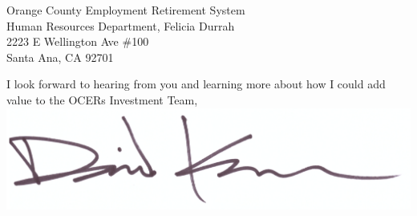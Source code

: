 \documentclass[10pt]{letter}
\begin{document}
\begin{letter}{
  Orange County Employment Retirement System \\ 
  Human Resources Department, Felicia Durrah \\
  2223 E Wellington Ave \#100 \\
  Santa Ana, CA  92701 \\
}
\closing{
  I look forward to hearing from you and learning more about how I could add
  value to the OCERs Investment Team, \\
  \vspace{.5in}
  \includegraphics[scale=0.4]{signature.png}
}

\end{letter}
\end{document}
